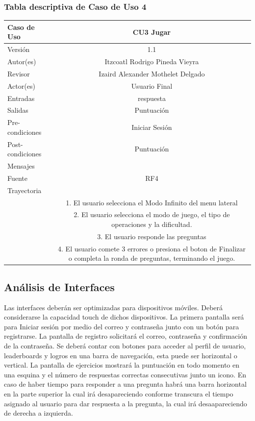 \documentclass{article}
\begin{document}
\subsubsection{Tabla descriptiva de Caso de Uso 4}
\begin{tabular}{|M{5cm}|c|}
\hline
Caso de Uso & CU3 Jugar\\ \hline
Versión & 1.1\\ \hline
Autor(es) & Itzcoatl Rodrigo Pineda Vieyra\\ \hline
Revisor & Izaird Alexander Mothelet Delgado \\ \hline
Actor(es) & Usuario Final \\ \hline
Entradas &  respuesta \\ \hline
Salidas & Puntuación \\ \hline
Pre-condiciones & Iniciar Sesión \\ \hline
Post-condiciones & Puntuación\\ \hline
Mensajes & \\
Fuente & RF4 \\ \hline	
	Trayectoria\\
		& 1.	El usuario selecciona el Modo Infinito del menu lateral\\
		& 2. El usuario selecciona el modo de juego, el tipo de operaciones y la dificultad.\\
		& 3.    El usuario responde  las preguntas \\
		& 4.	El usuario comete 3 errores o presiona el boton de Finalizar o completa la ronda de preguntas, terminando el juego.\\ \hline
\end{tabular}
\subsection{Análisis de Interfaces}
Las interfaces deberán ser optimizadas para dispositivos móviles. Deberá considerarse la capacidad touch de dichos dispositivos. La primera pantalla será para Iniciar sesión por medio del correo y contraseña junto con un botón para registrarse. La pantalla de registro solicitará el correo, contraseña y confirmación de la contraseña. Se deberá contar con botones para acceder al perfil de usuario, leaderboards y logros en una barra de navegación, esta puede ser horizontal o vertical. La pantalla de ejercicios mostrará la puntuación en todo momento en una esquina y el número de respuestas correctas consecutivas junto un icono. En caso de haber tiempo para responder a una pregunta habrá una barra horizontal en la parte superior la cual irá desapareciendo conforme transcura el tiempo asignado al usuario para dar respuesta a la pregunta, la cual irá  desaapareciendo de derecha a izquierda.
\end{document}
